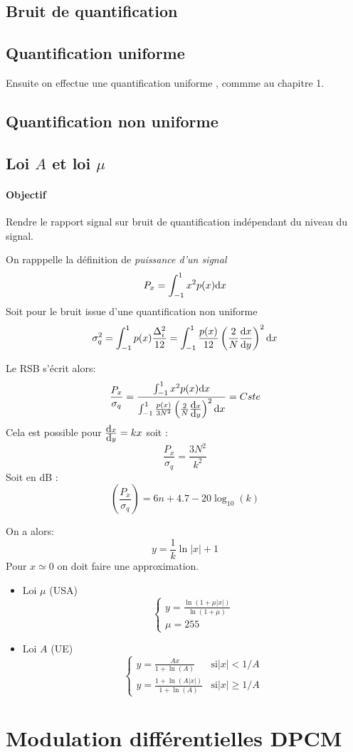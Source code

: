 \documentclass[main.tex]{subfiles}
\begin{document}
\subsection{Bruit de quantification}
\subsection{Quantification uniforme}
Ensuite on effectue une quantification uniforme , commme au chapitre 1.
\subsection{Quantification non uniforme}

\subsection{Loi $A$ et loi $\mu$}
\paragraph{Objectif}
Rendre le rapport signal sur bruit de quantification indépendant du niveau du signal.

\begin{defin}
  On rapppelle la définition de \emph{puissance d'un signal}
  \[
    P_x=\int_{-1}^{1}x^2 p(x)\d x
  \]
  Soit pour le bruit issue d'une quantification non uniforme
  \[
    \sigma_q^2 = \int_{-1}^{1}p(x)\frac{\Delta_i^2}{12} = \int_{-1}^{1}\frac{p(x)}{12} \left(\frac{2}{N}\deriv[x]{y}\right)^2\d x
  \]
\end{defin}
\begin{prop}
  Le RSB s'écrit alors:
  \[
    \frac{P_x}{\sigma_q} = \frac{\int_{-1}^{1}x^2 p(x)\d x}{\int_{-1}^{1}\frac{p(x)}{3N^2} \left(\frac{2}{N}\deriv[x]{y}\right)^2\d x} =Cste
  \]
  Cela est possible pour $\deriv[x]{y}=kx$ soit :
  \[
\frac{P_x}{\sigma_q} = \frac{3N^2}{k^2}
\]
Soit en dB :
\[
\left(\frac{P_x}{\sigma_q}\right)= 6 n +4.7 -20 \log_{10}(k)
\]
\end{prop}


\begin{rem}
  On a alors:
   \[
     y = \frac{1}{k}\ln |x|+1
   \]
   Pour $x\simeq 0$ on doit faire une approximation.
 \end{rem}
 \begin{prop}
   \begin{itemize}
   \item Loi $\mu$ (USA)
   \[
     \begin{cases}
       y =\frac{\ln(1+\mu|x|)}{\ln(1+\mu)} \\
       \mu = 255
     \end{cases}
   \]
 \item Loi $A$ (UE)
   \[
   \begin{cases}
     y = \frac{Ax}{1+\ln(A)}  & \text{si} |x| < 1/A\\
     y= \frac{1+\ln(A|x|)}{1+\ln(A)} & \text{si} |x| \ge 1/A
   \end{cases}
   \]
 \end{itemize}
 \end{prop}
\section{Modulation différentielles DPCM}
\end{document}
